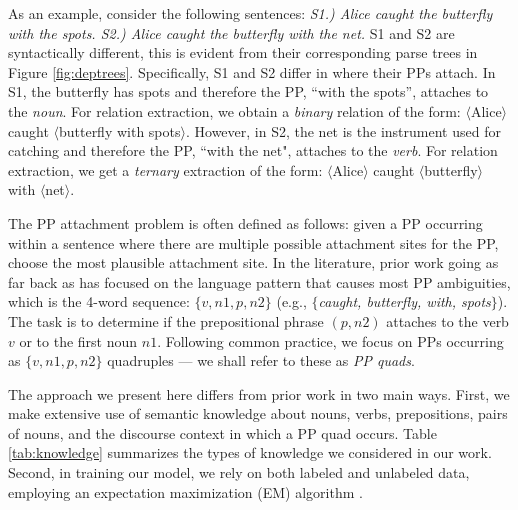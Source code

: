  As an example, consider the following sentences: \textit{ S1.) Alice caught the butterfly with the spots. S2.) Alice caught the butterfly with the net. }  S1 and S2 are syntactically different, this is evident from their corresponding parse trees in Figure \ref{fig:deptrees}. Specifically,  S1 and S2  differ in where their PPs attach. In  S1,  the butterfly has spots and therefore  the PP, ``with the spots'', attaches to the \textit{noun}. For relation extraction, we  obtain a \textit{binary} relation of the form:  
 $\langle$Alice$\rangle$  caught $\langle$butterfly with  spots$\rangle$.
However, in S2, the net is the instrument used for catching and therefore  the PP,  ``with the net", attaches to the \textit{verb}.  For relation extraction, we get a \textit{ternary} extraction of the form:
 $\langle$Alice$\rangle$  caught $\langle$butterfly$\rangle$ with $\langle$net$\rangle$.
 
The PP attachment problem is often defined as follows: given a PP occurring within a  sentence where there are multiple possible attachment sites for the PP, choose the most plausible attachment site. 
 In the literature,  prior work going as far back as \cite{BrillR94,Ratnaparkhi1994,Collins95} has  focused on the  language pattern that causes most PP ambiguities, which is the  4-word sequence: $\{v, n1, p, n2\}$ (e.g., $\{${\em caught, butterfly, with, spots}$\}$). The task is  to   determine if  the prepositional phrase $(p,n2)$  attaches to  the verb $v$ or to the first noun $n1$.
Following common practice,  we focus on  PPs occurring as $\{v,n1,p,n2\}$ quadruples ---  we shall refer to these as  \textit{PP quads}. 

The approach we present here differs from prior work in two main ways. First, we make extensive use of semantic knowledge about nouns, verbs, prepositions, pairs of nouns, and  the discourse context in which a PP quad occurs. Table \ref{tab:knowledge}  summarizes the types of  knowledge we considered in our work. Second, in training our model, we rely on both labeled and unlabeled data, employing an expectation maximization (EM) algorithm \cite{Dempster77maximumlikelihood}. 


